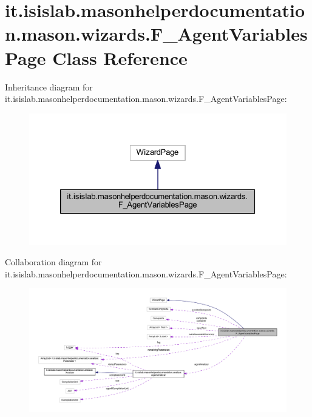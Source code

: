 \hypertarget{classit_1_1isislab_1_1masonhelperdocumentation_1_1mason_1_1wizards_1_1_f___agent_variables_page}{\section{it.\-isislab.\-masonhelperdocumentation.\-mason.\-wizards.\-F\-\_\-\-Agent\-Variables\-Page Class Reference}
\label{classit_1_1isislab_1_1masonhelperdocumentation_1_1mason_1_1wizards_1_1_f___agent_variables_page}
}


Inheritance diagram for it.\-isislab.\-masonhelperdocumentation.\-mason.\-wizards.\-F\-\_\-\-Agent\-Variables\-Page\-:
\nopagebreak
\begin{figure}[H]
\begin{center}
\leavevmode
\includegraphics[width=326pt]{classit_1_1isislab_1_1masonhelperdocumentation_1_1mason_1_1wizards_1_1_f___agent_variables_page__inherit__graph}
\end{center}
\end{figure}


Collaboration diagram for it.\-isislab.\-masonhelperdocumentation.\-mason.\-wizards.\-F\-\_\-\-Agent\-Variables\-Page\-:
\nopagebreak
\begin{figure}[H]
\begin{center}
\leavevmode
\includegraphics[width=350pt]{classit_1_1isislab_1_1masonhelperdocumentation_1_1mason_1_1wizards_1_1_f___agent_variables_page__coll__graph}
\end{center}
\end{figure}
